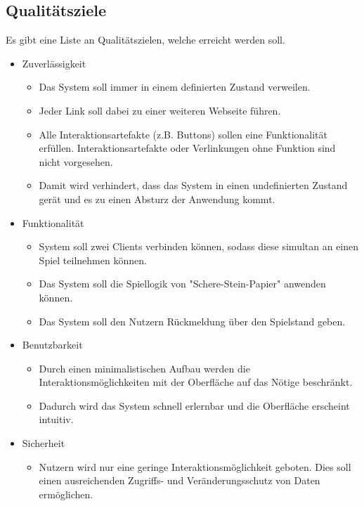 \documentclass[conference]{IEEEtran}
\begin{document}
\begin{itemize}
\section{Qualitätsziele}

Es gibt eine Liste an Qualitätszielen, welche erreicht werden soll.


\begin{itemize}
    \item Zuverlässigkeit \\
     \begin{itemize}
    \item  Das System soll immer in einem definierten Zustand verweilen.
    \item Jeder Link soll dabei zu einer weiteren Webseite führen.
    \item Alle Interaktionsartefakte (z.B. Buttons) sollen eine Funktionalität erfüllen. Interaktionsartefakte oder Verlinkungen ohne Funktion sind nicht vorgesehen.
    \item Damit wird verhindert, dass das System in einen undefinierten Zustand gerät und es zu einen Absturz der Anwendung kommt.
  \end{itemize}
    
    \item Funktionalität \\
    \begin{itemize}
        \item System soll zwei Clients verbinden können, sodass diese simultan an einen Spiel teilnehmen können.
        \item Das System soll die Spiellogik von "Schere-Stein-Papier" anwenden können.
        \item  Das System soll den Nutzern Rückmeldung über den Spielstand geben.
    \end{itemize}
    \item Benutzbarkeit \\
    \begin{itemize}
        \item Durch einen minimalistischen Aufbau werden die Interaktionsmöglichkeiten mit der Oberfläche auf das Nötige beschränkt.
        \item Dadurch wird das System schnell erlernbar und die Oberfläche erscheint intuitiv.
    \end{itemize}
    \item Sicherheit \\
    \begin{itemize}
        \item Nutzern wird nur eine geringe Interaktionsmöglichkeit geboten. Dies soll einen ausreichenden Zugriffs- und Veränderungsschutz von Daten ermöglichen.
    \end{itemize}
    

\end{itemize}
\end{itemize}
\end{document}
